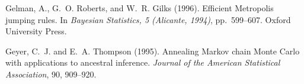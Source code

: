 \documentclass{article}
\begin{document}


\begin{thebibliography}{}

Gelman, A., G.~O. Roberts, and W.~R. Gilks (1996).
\newblock Efficient Metropolis jumping rules.
\newblock In \emph{Bayesian Statistics, 5 (Alicante, 1994)}, pp.~599--607.
  Oxford University Press.

Geyer, C.~J. and E.~A. Thompson (1995).
\newblock Annealing Markov chain Monte Carlo with applications to
    ancestral inference.
\newblock \emph{Journal of the American Statistical Association}, 90, 909--920.

\end{thebibliography}
\end{document}
